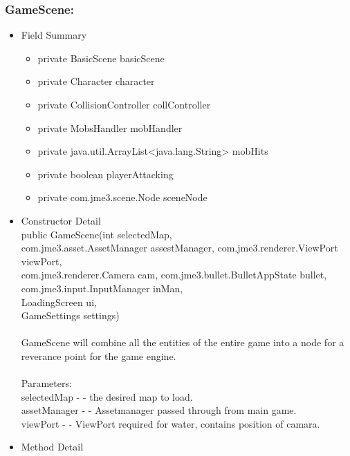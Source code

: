 \documentclass[letterpaper]{article}
\begin{document}
						\subsubsection*{GameScene:}
						\vspace{0.1in}
							\begin{itemize}
								\item	Field Summary
										\begin{itemize}
											\item	private BasicScene	basicScene 
											\item	private Character	character 
											\item	private CollisionController	collController 
											\item	private MobsHandler	mobHandler 
											\item	private java.util.ArrayList<java.lang.String>	mobHits 
											\item	private boolean	playerAttacking 
											\item	private com.jme3.scene.Node	sceneNode  
										\end{itemize}
								\item	Constructor Detail \\
										public GameScene(int selectedMap, \\ com.jme3.asset.AssetManager assestManager, com.jme3.renderer.ViewPort viewPort, \\ com.jme3.renderer.Camera cam, com.jme3.bullet.BulletAppState bullet, \\ com.jme3.input.InputManager inMan, \\ LoadingScreen ui, \\ GameSettings settings) \\ \\
										GameScene will combine all the entities of the entire game into a node for a reverance point for the game engine. \\ \\
										Parameters: \\
										selectedMap - - the desired map to load. \\
										assetManager - - Assetmanager passed through from main game. \\
										viewPort - - ViewPort required for water, contains position of camara.
								\item	Method Detail
										\begin{itemize}

\end{itemize}
\end{itemize}
\end{document}
